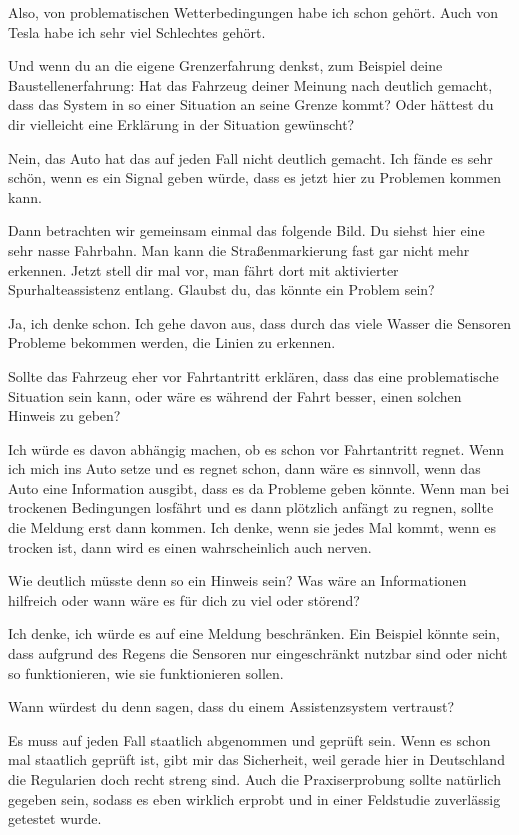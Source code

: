 Also, von problematischen Wetterbedingungen habe ich schon gehört. Auch
von Tesla habe ich sehr viel Schlechtes gehört.

\interviewerin
Und wenn du an die eigene Grenzerfahrung denkst, zum Beispiel deine
Baustellenerfahrung: Hat das Fahrzeug deiner Meinung nach deutlich
gemacht, dass das System in so einer Situation an seine Grenze kommt?
Oder hättest du dir vielleicht eine Erklärung in der Situation gewünscht?

Nein, das Auto hat das auf jeden Fall nicht deutlich gemacht. Ich fände
es sehr schön, wenn es ein Signal geben würde, dass es jetzt hier zu
Problemen kommen kann.

\interviewerin
Dann betrachten wir gemeinsam einmal das folgende Bild. Du siehst hier
eine sehr nasse Fahrbahn. Man kann die Straßenmarkierung fast gar nicht
mehr erkennen. Jetzt stell dir mal vor, man fährt dort mit aktivierter
Spurhalteassistenz entlang. Glaubst du, das könnte ein Problem sein?

Ja, ich denke schon. Ich gehe davon aus, dass durch das viele Wasser die
Sensoren Probleme bekommen werden, die Linien zu erkennen.

\interviewerin
Sollte das Fahrzeug eher vor Fahrtantritt erklären, dass das eine
problematische Situation sein kann, oder wäre es während der Fahrt
besser, einen solchen Hinweis zu geben?

Ich würde es davon abhängig machen, ob es schon vor Fahrtantritt regnet.
Wenn ich mich ins Auto setze und es regnet schon, dann wäre es sinnvoll,
wenn das Auto eine Information ausgibt, dass es da Probleme geben
könnte. Wenn man bei trockenen Bedingungen losfährt und es dann
plötzlich anfängt zu regnen, sollte die Meldung erst dann kommen. Ich
denke, wenn sie jedes Mal kommt, wenn es trocken ist, dann wird es einen
wahrscheinlich auch nerven.

\interviewerin
Wie deutlich müsste denn so ein Hinweis sein? Was wäre an Informationen
hilfreich oder wann wäre es für dich zu viel oder störend?

Ich denke, ich würde es auf eine Meldung beschränken. Ein Beispiel
könnte sein, dass aufgrund des Regens die Sensoren nur eingeschränkt
nutzbar sind oder nicht so funktionieren, wie sie funktionieren sollen.

\interviewerin
Wann würdest du denn sagen, dass du einem Assistenzsystem vertraust?

Es muss auf jeden Fall staatlich abgenommen und geprüft sein. Wenn es
schon mal staatlich geprüft ist, gibt mir das Sicherheit, weil gerade
hier in Deutschland die Regularien doch recht streng sind. Auch die
Praxiserprobung sollte natürlich gegeben sein, sodass es eben wirklich
erprobt und in einer Feldstudie zuverlässig getestet wurde.

